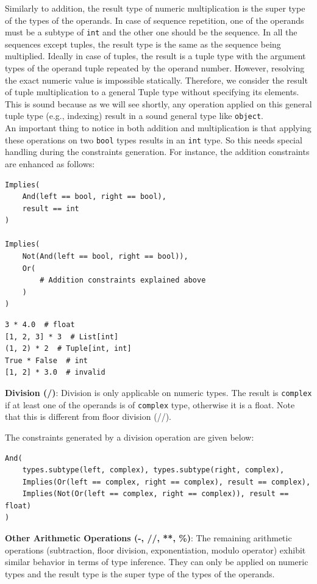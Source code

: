 Similarly to addition, the result type of numeric multiplication is the super type of the types of the operands. In case of sequence repetition, one of the operands must be a subtype of \lstinline|int| and the other one should be the sequence. In all the sequences except tuples, the result type is the same as the sequence being multiplied. Ideally in case of tuples, the result is a tuple type with the argument types of the operand tuple repeated by the operand number. However, resolving the exact numeric value is impossible statically. Therefore, we consider the result of tuple multiplication to a general Tuple type without specifying its elements. This is sound because as we will see shortly, any operation applied on this general tuple type (e.g., indexing) result in a sound general type like \lstinline|object|. \\
An important thing to notice in both addition and multiplication is that applying these operations on two \lstinline|bool| types results in an \lstinline|int| type. So this needs special handling during the constraints generation. For instance, the addition constraints are enhanced as follows:
\begin{lstlisting}
Implies(
	And(left == bool, right == bool),
	result == int
)

Implies(
	Not(And(left == bool, right == bool)),
	Or(
		# Addition constraints explained above
	)
)
\end{lstlisting}

\begin{lstlisting}
3 * 4.0  # float
[1, 2, 3] * 3  # List[int]
(1, 2) * 2  # Tuple[int, int]
True * False  # int
[1, 2] * 3.0  # invalid
\end{lstlisting}

\textbf{Division (/)}: Division is only applicable on numeric types. The result is \lstinline|complex| if at least one of the operands is of \lstinline|complex| type, otherwise it is a float. Note that this is different from floor division (//).

The constraints generated by a division operation are given below:

\begin{lstlisting}
And(
	types.subtype(left, complex), types.subtype(right, complex),
	Implies(Or(left == complex, right == complex), result == complex),
	Implies(Not(Or(left == complex, right == complex)), result == float)
)
\end{lstlisting}

\textbf{Other Arithmetic Operations (-, //, **, \%)}:
The remaining arithmetic operations (subtraction, floor division, exponentiation, modulo operator) exhibit similar behavior in terms of type inference. They can only be applied on numeric types and the result type is the super type of the types of the operands. \\

